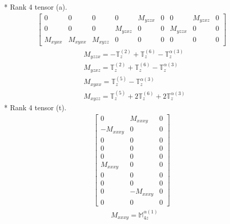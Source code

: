 \documentclass[fleqn,8pt,landscape]{jsarticle}
\begin{document}
* Rank 4 tensor (a).
\begin{align*}
\begin{bmatrix} 0 & 0 & 0 & 0 & M_{yzzx} & 0 & 0 & M_{yzxz} & 0 \\ 0 & 0 & 0 & M_{yzxz} & 0 & 0 & M_{yzzx} & 0 & 0 \\ M_{xyxx} & M_{xyxx} & M_{xyzz} & 0 & 0 & 0 & 0 & 0 & 0 \end{bmatrix}
\end{align*}
\begin{align*}
& M_{yzzx} = - \mathbb{T}_{z}^{(2)} + \mathbb{T}_{z}^{(6)} - \mathbb{T}_{z}^{\alpha(3)} \\
& M_{yzxz} = \mathbb{T}_{z}^{(2)} + \mathbb{T}_{z}^{(6)} - \mathbb{T}_{z}^{\alpha(3)} \\
& M_{xyxx} = \mathbb{T}_{z}^{(5)} - \mathbb{T}_{z}^{\alpha(3)} \\
& M_{xyzz} = \mathbb{T}_{z}^{(5)} + 2 \mathbb{T}_{z}^{(6)} + 2 \mathbb{T}_{z}^{\alpha(3)}
\end{align*}
* Rank 4 tensor (t).
\begin{align*}
\begin{bmatrix} 0 & M_{xxxy} & 0 \\ - M_{xxxy} & 0 & 0 \\ 0 & 0 & 0 \\ 0 & 0 & 0 \\ 0 & 0 & 0 \\ M_{xxxy} & 0 & 0 \\ 0 & 0 & 0 \\ 0 & 0 & 0 \\ 0 & - M_{xxxy} & 0 \\ 0 & 0 & 0 \end{bmatrix}
\end{align*}
\begin{align*}
& M_{xxxy} = \mathbb{M}_{4z}^{\alpha(1)}
\end{align*}
\end{document}
